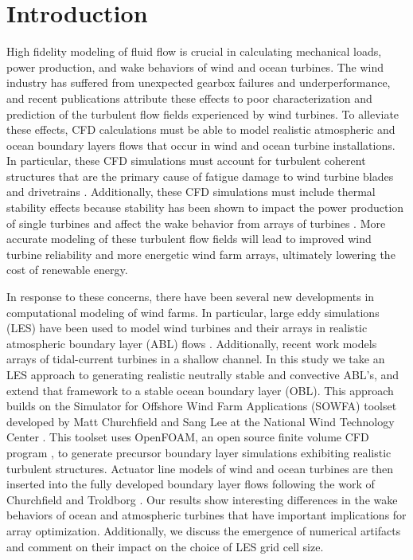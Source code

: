 \section{Introduction}
High fidelity modeling of fluid flow is crucial in calculating mechanical loads, power production, and wake behaviors of wind and ocean turbines.  The wind industry has suffered from unexpected gearbox failures and underperformance, and recent publications attribute these effects to poor characterization and prediction of the turbulent flow fields experienced by wind turbines.  To alleviate these effects, CFD calculations must be able to model realistic atmospheric and ocean boundary layers flows that occur in wind and ocean turbine installations.  In particular, these CFD simulations must account for turbulent coherent structures that are the primary cause of fatigue damage to wind turbine blades and drivetrains \cite{kelley_impact_2005,lee_atmospheric_2011}.  Additionally, these CFD simulations must include thermal stability effects because stability has been shown to impact the power production of single turbines and affect the wake behavior from arrays of turbines \cite{wharton_atmospheric_2012,wharton_assessing_2011}.  More accurate modeling of these turbulent flow fields will lead to improved wind turbine reliability and more energetic wind farm arrays, ultimately lowering the cost of renewable energy.

In response to these concerns, there have been several new developments in computational modeling of wind farms.  In particular, large eddy simulations (LES) have been used to  model wind turbines and their arrays in realistic atmospheric boundary layer (ABL) flows \cite{calaf_large_2010,lu_large-eddy_2011,porte-agel_large-eddy_2011,wu_large-eddy_2010,sanderse_review_2011}.  Additionally, recent work models arrays of tidal-current turbines \cite{churchfield_large-eddy_2011} in a shallow channel. In this study we take an LES approach to generating realistic neutrally stable and convective ABL's, and extend that framework to a stable ocean boundary layer (OBL).  This approach builds on the Simulator for Offshore Wind Farm Applications (SOWFA) toolset developed by Matt Churchfield and Sang Lee at the National Wind Technology Center \cite{SOWFA}.  This toolset uses OpenFOAM, an open source finite volume CFD program \cite{OpenFOAM}, to generate precursor boundary layer simulations exhibiting realistic turbulent structures.  Actuator line models of wind and ocean turbines are then inserted into the fully developed boundary layer flows following the work of Churchfield and Troldborg \cite{churchfield_large-eddy_2012,churchfield_numerical_2012,troldborg_actuator_2007}.  Our results show interesting differences in the wake behaviors of ocean and atmospheric turbines that have important implications for array optimization.  Additionally, we discuss the emergence of numerical artifacts and comment on their impact on the choice of LES grid cell size.
